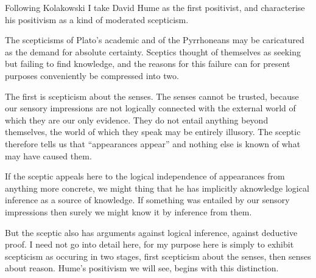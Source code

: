 Following Kolakowski I take David Hume as the first positivist, and characterise his positivism as a kind of moderated scepticism.

The scepticisms of Plato's academic and of the Pyrrhoneans may be caricatured as the demand for absolute certainty.
Sceptics thought of themselves as seeking but failing to find knowledge, and the reasons for this failure can for present purposes conveniently be compressed into two.

The first is scepticism about the senses.
The senses cannot be trusted, because our sensory impressions are not logically connected with the external world of which they are our only evidence.
They do not entail anything beyond themselves, the world of which they speak may be entirely illusory.
The sceptic therefore tells us that ``appearances appear'' and nothing else is known of what may have caused them.

If the sceptic appeals here to the logical independence of appearances from anything more concrete, we might thing that he has implicitly aknowledge logical inference as a source of knowledge.
If something was entailed by our sensory impressions then surely we might know it by inference from them.

But the sceptic also has arguments against logical inference, against deductive proof.
I need not go into detail here, for my purpose here is simply to exhibit scepticism as occuring in two stages, first scepticism about the senses, then senses about reason.
Hume's positivism we will see, begins with this distinction.
